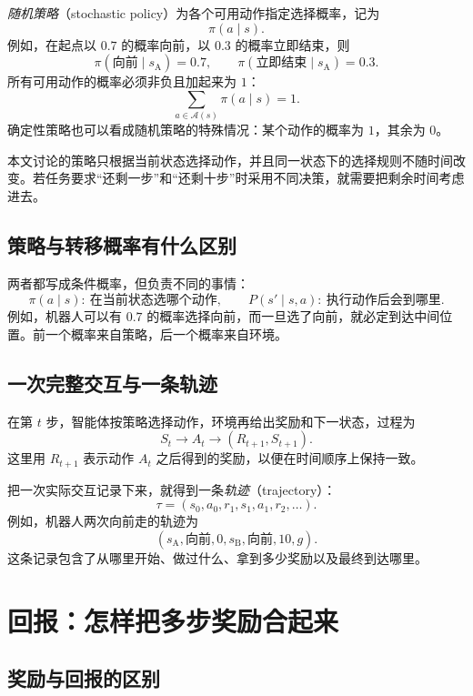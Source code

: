 \documentclass[UTF8,12pt,a4paper,fontset=fandol]{ctexart}
\begin{document}
\emph{随机策略}（stochastic policy）为各个可用动作指定选择概率，记为
\[
  \pi(a\mid s).
\]
例如，在起点以 $0.7$ 的概率向前，以 $0.3$ 的概率立即结束，则
\[
  \pi(\text{向前}\mid s_{\mathrm A})=0.7,
  \qquad
  \pi(\text{立即结束}\mid s_{\mathrm A})=0.3.
\]
所有可用动作的概率必须非负且加起来为 $1$：
\begin{equation}
  \sum_{a\in\mathcal A(s)}\pi(a\mid s)=1.
  \label{eq:mdp-policy-sum}
\end{equation}
确定性策略也可以看成随机策略的特殊情况：某个动作的概率为 $1$，其余为 $0$。

本文讨论的策略只根据当前状态选择动作，并且同一状态下的选择规则不随时间改变。若任务要求“还剩一步”和“还剩十步”时采用不同决策，就需要把剩余时间考虑进去。

\subsection{策略与转移概率有什么区别}

两者都写成条件概率，但负责不同的事情：
\[
  \pi(a\mid s):\ \text{在当前状态选哪个动作},
  \qquad
  P(s'\mid s,a):\ \text{执行动作后会到哪里}.
\]
例如，机器人可以有 $0.7$ 的概率选择向前，而一旦选了向前，就必定到达中间位置。前一个概率来自策略，后一个概率来自环境。

\subsection{一次完整交互与一条轨迹}

在第 $t$ 步，智能体按策略选择动作，环境再给出奖励和下一状态，过程为
\begin{equation}
  S_t\longrightarrow A_t\longrightarrow(R_{t+1},S_{t+1}).
  \label{eq:mdp-interaction}
\end{equation}
这里用 $R_{t+1}$ 表示动作 $A_t$ 之后得到的奖励，以便在时间顺序上保持一致。

把一次实际交互记录下来，就得到一条\emph{轨迹}（trajectory）：
\[
  \tau=(s_0,a_0,r_1,s_1,a_1,r_2,\ldots).
\]
例如，机器人两次向前走的轨迹为
\[
  (s_{\mathrm A},\text{向前},0,s_{\mathrm B},\text{向前},10,g).
\]
这条记录包含了从哪里开始、做过什么、拿到多少奖励以及最终到达哪里。

\section{回报：怎样把多步奖励合起来}
\label{sec:mdp-return}

\subsection{奖励与回报的区别}
\end{document}
